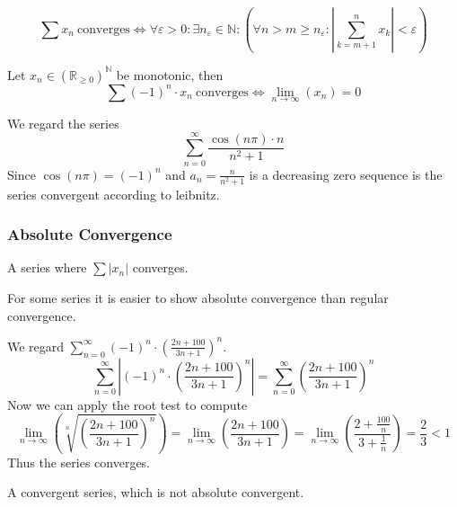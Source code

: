 \begin{theorem}\label{thm:cauchy_crit_ser}
   \[\sum x_n~\text{converges} \iff \forall \varepsilon > 0: \exists n_\varepsilon \in \mathbb{N}: \left(\forall n > m \geq n_\varepsilon: \left| \sum_{k = m + 1}^n x_k \right| < \varepsilon \right)\]
\end{theorem}

\begin{proposition}\label{pro:leibnitz}
   Let \(x_n \in (\mathbb{R}_{\geq 0})^\mathbb{N}\) be monotonic, then
   \[\sum (-1)^{n} \cdot x_n~\text{converges} \iff \lim_{n \to \infty}(x_n) = 0\]
\end{proposition}
\begin{example}
   We regard the series
   \[\sum_{n=0}^\infty \frac{\cos(n \pi) \cdot n}{n^2 + 1}\]
   Since \(\cos(n \pi) = (-1)^n\) and \(a_n = \frac{n}{n^2 + 1}\) is a decreasing zero sequence is the series convergent according to leibnitz.
\end{example}

\subsubsection{Absolute Convergence}
\begin{definition}
   A series where \(\sum |x_n|\) converges.
\end{definition}
\begin{remark}[Tips]
   For some series it is easier to show absolute convergence than regular convergence.
\end{remark}
\begin{example}
   We regard \(\sum_{n=0}^\infty (-1)^n \cdot \left(\frac{2n + 100}{3n + 1}\right)^n\).
   \[\sum_{n=0}^\infty \left\lvert (-1)^n \cdot \left(\frac{2n + 100}{3n + 1}\right)^n \right\rvert = \sum_{n=0}^\infty \left(\frac{2n + 100}{3n + 1}\right)^n\]
   Now we can apply the root test to compute
   \[\lim_{n \to \infty} \left(\sqrt[n]{\left(\frac{2n+100}{3n+1}\right)^n}\right) = \lim_{n \to \infty}\left(\frac{2n+100}{3n+1}\right) = \lim_{n \to \infty}\left(\frac{2 + \frac{100}{n}}{3 + \frac{1}{n}}\right) = \frac{2}{3} < 1\]
   Thus the series converges.
\end{example}

\begin{definition}
   A convergent series, which is not absolute convergent.
\end{definition}

